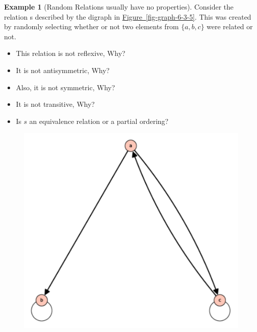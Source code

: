 \documentclass[10pt,]{book}
\theoremstyle{plain}
\theoremstyle{definition}
\theoremstyle{definition}
\theoremstyle{definition}
\newtheorem{example}[theorem]{Example}
\theoremstyle{definition}
\begin{document}
\begin{example}[Random Relations usually have no properties]\label{ex-no-propery-relation}
Consider the relation s described by the digraph in \hyperref[fig-graph-6-3-5]{Figure~\ref{fig-graph-6-3-5}}. This was created by randomly selecting whether or not two elements from \(\{a,b,c\}\) were related or not. %
\par
\leavevmode%
\begin{itemize}[label=\textbullet]
\item{}This relation is not reflexive, Why?%
\item{}It is not antisymmetric, Why?%
\item{}Also, it is not symmetric, Why?%
\item{}It is not transitive, Why?%
\item{}Is \(s\) an equivalence relation or a partial ordering? %
\end{itemize}
%
\leavevmode%
\begin{figure}
\centering
{}%
{\includegraphics[width=1\linewidth]{images/graph-6-3-5.pdf}}%

\end{figure}
\end{example}
\end{document}
